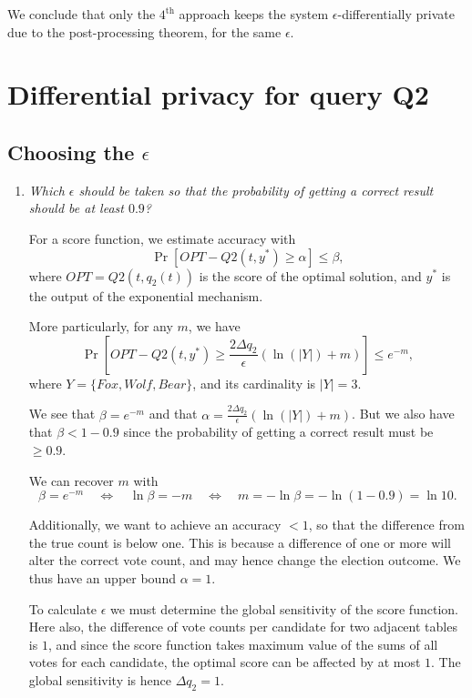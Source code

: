 \documentclass[parskip=half]{scrartcl}
\begin{document}
We conclude that only the $4^\text{th}$ approach keeps the system
$\epsilon$-differentially private due to the post-processing theorem, for the
same $\epsilon$.

\section{Differential privacy for query Q2}

\subsection{Choosing the \texorpdfstring{$\epsilon$}{ε}}

\begin{enumerate}
    \item \textit{Which $\epsilon$ should be taken so that the probability of
    getting a correct result should be at least $0.9$?}

    For a score function, we estimate accuracy with
    $$
        \Pr[OPT - Q2(t, y^*) \ge \alpha] \le \beta,
    $$
    where $OPT=Q2(t, q_2(t))$ is the score of the optimal solution, and $y^*$ is
    the output of the exponential mechanism.
    
    More particularly, for any $m$, we have
    $$
        \Pr[OPT - Q2(t, y^*) \ge
        \frac{2\Delta q_2}{\epsilon}(\ln{(|Y|)} + m)] \le e^{-m},
    $$
    where $Y = \{Fox, Wolf, Bear\}$, and its cardinality is $|Y|=3$.

    We see that $\beta = e^{-m}$ and that $\alpha =
    \frac{2\Delta q_2}{\epsilon}(\ln{(|Y|)} + m)$. But we also have that
    $\beta < 1 - 0.9$ since the probability of getting a correct result must be
    $\ge 0.9$.

    We can recover $m$ with
    $$
        \beta = e^{-m} \quad\Leftrightarrow\quad
        \ln{\beta} = -m \quad\Leftrightarrow\quad
        m = -\ln{\beta} = -\ln{(1 - 0.9)}=\ln{10}.
    $$

    Additionally, we want to achieve an accuracy $<1$, so that the difference
    from the true count is below one. This is because a difference of one or
    more will alter the correct vote count, and may hence change the election
    outcome. We thus have an upper bound $\alpha=1$.

    To calculate $\epsilon$ we must determine the global sensitivity of the
    score function. Here also, the difference of vote counts per candidate
    for two adjacent tables is $1$, and since the score function takes maximum
    value of the sums of all votes for each candidate, the optimal score can
    be affected by at most $1$. The global sensitivity is hence
    $\Delta q_2 = 1$.


\end{enumerate}
\end{document}
